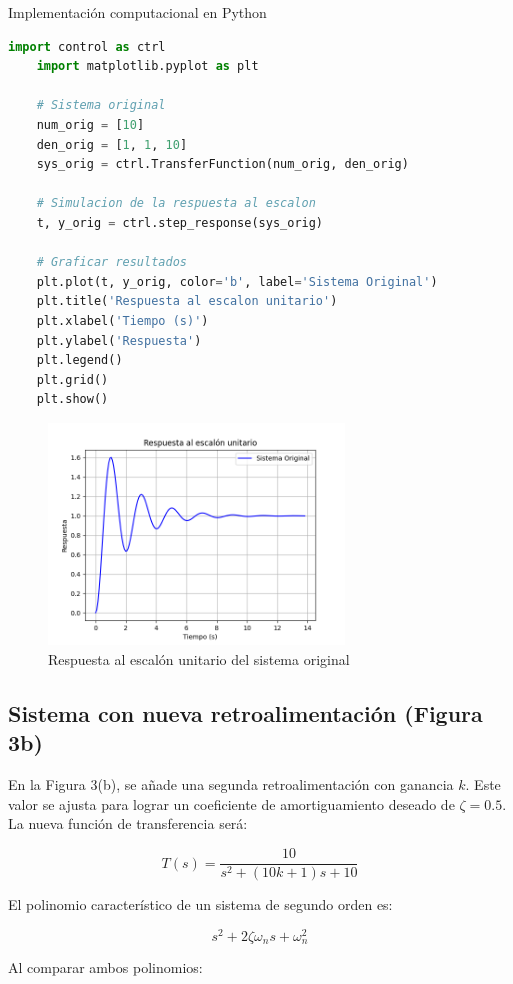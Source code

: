 \documentclass[10pt]{article}
\theoremstyle{definition}
\theoremstyle{remark}
\theoremstyle{definition}
\numberwithin{equation}{prob}
\begin{document}
Implementación computacional en Python
\begin{lstlisting}[language=Python]
	import control as ctrl
	import matplotlib.pyplot as plt
	
	# Sistema original
	num_orig = [10]
	den_orig = [1, 1, 10]
	sys_orig = ctrl.TransferFunction(num_orig, den_orig)

	# Simulacion de la respuesta al escalon
	t, y_orig = ctrl.step_response(sys_orig)

	# Graficar resultados
	plt.plot(t, y_orig, color='b', label='Sistema Original')
	plt.title('Respuesta al escalon unitario')
	plt.xlabel('Tiempo (s)')
	plt.ylabel('Respuesta')
	plt.legend()
	plt.grid()
	plt.show()
\end{lstlisting}

\begin{figure}[h]
	\centering
	\includegraphics[width=0.7\textwidth]{./figures/Figura 4 ejercicio 5.png}
	\caption{Respuesta al escalón unitario del sistema original}
\end{figure}

\subsection{Sistema con nueva retroalimentación (Figura 3b)}

En la Figura 3(b), se añade una segunda retroalimentación con ganancia \(k\). Este valor se ajusta para lograr un coeficiente de amortiguamiento deseado de \( \zeta = 0.5 \). La nueva función de transferencia será:

\[
T(s) = \frac{10}{s^2 + (10k + 1)s + 10}
\]

El polinomio característico de un sistema de segundo orden es:

\[
s^2 + 2\zeta \omega_n s + \omega_n^2
\]

Al comparar ambos polinomios:
\end{document}
